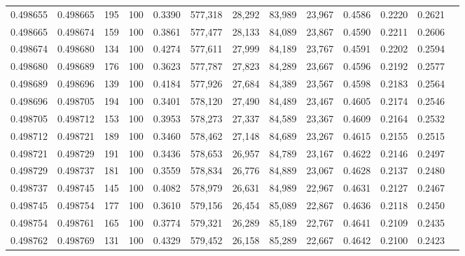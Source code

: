 \begin{tabular}{rrrrrrrrrrrrr}
0.498655 & 0.498665 &   195 & 100 &                                     0.3390 & 577,318 &  28,292 &  83,989 &  23,967 & 0.4586 & 0.2220 & 0.2621 \\
0.498665 & 0.498674 &   159 & 100 &                                     0.3861 & 577,477 &  28,133 &  84,089 &  23,867 & 0.4590 & 0.2211 & 0.2606 \\
0.498674 & 0.498680 &   134 & 100 &                                     0.4274 & 577,611 &  27,999 &  84,189 &  23,767 & 0.4591 & 0.2202 & 0.2594 \\
0.498680 & 0.498689 &   176 & 100 &                                     0.3623 & 577,787 &  27,823 &  84,289 &  23,667 & 0.4596 & 0.2192 & 0.2577 \\
0.498689 & 0.498696 &   139 & 100 &                                     0.4184 & 577,926 &  27,684 &  84,389 &  23,567 & 0.4598 & 0.2183 & 0.2564 \\
0.498696 & 0.498705 &   194 & 100 &                                     0.3401 & 578,120 &  27,490 &  84,489 &  23,467 & 0.4605 & 0.2174 & 0.2546 \\
0.498705 & 0.498712 &   153 & 100 &                                     0.3953 & 578,273 &  27,337 &  84,589 &  23,367 & 0.4609 & 0.2164 & 0.2532 \\
0.498712 & 0.498721 &   189 & 100 &                                     0.3460 & 578,462 &  27,148 &  84,689 &  23,267 & 0.4615 & 0.2155 & 0.2515 \\
0.498721 & 0.498729 &   191 & 100 &                                     0.3436 & 578,653 &  26,957 &  84,789 &  23,167 & 0.4622 & 0.2146 & 0.2497 \\
0.498729 & 0.498737 &   181 & 100 &                                     0.3559 & 578,834 &  26,776 &  84,889 &  23,067 & 0.4628 & 0.2137 & 0.2480 \\
0.498737 & 0.498745 &   145 & 100 &                                     0.4082 & 578,979 &  26,631 &  84,989 &  22,967 & 0.4631 & 0.2127 & 0.2467 \\
0.498745 & 0.498754 &   177 & 100 &                                     0.3610 & 579,156 &  26,454 &  85,089 &  22,867 & 0.4636 & 0.2118 & 0.2450 \\
0.498754 & 0.498761 &   165 & 100 &                                     0.3774 & 579,321 &  26,289 &  85,189 &  22,767 & 0.4641 & 0.2109 & 0.2435 \\
0.498762 & 0.498769 &   131 & 100 &                                     0.4329 & 579,452 &  26,158 &  85,289 &  22,667 & 0.4642 & 0.2100 & 0.2423 \\

\end{tabular}
